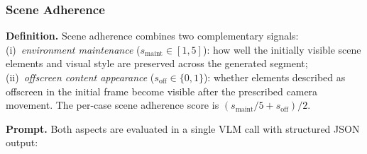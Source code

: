 \documentclass{llmxive}
\providecommand{\myparagraph}[1]{\vspace{-0.1em}\noindent\textbf{#1}\hspace{0.3em}}
\begin{document}
\subsubsection{Scene Adherence}
\label{app:scene_adherence_detail}

\myparagraph{Definition.}
Scene adherence combines two complementary signals:
(i)~\emph{environment maintenance} ($s_{\mathrm{maint}} \in [1,5]$): how well the initially visible scene elements and visual style are preserved across the generated segment;
(ii)~\emph{offscreen content appearance} ($s_{\mathrm{off}} \in \{0,1\}$): whether elements described as offscreen in the initial frame become visible after the prescribed camera movement.
The per-case scene adherence score is $(s_{\mathrm{maint}}/5 + s_{\mathrm{off}}) / 2$.

\myparagraph{Prompt.}
Both aspects are evaluated in a single VLM call with structured JSON output:
\end{document}
